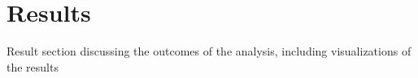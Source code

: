 \section{Results}

Result section discussing the outcomes of the analysis, including visualizations of the results